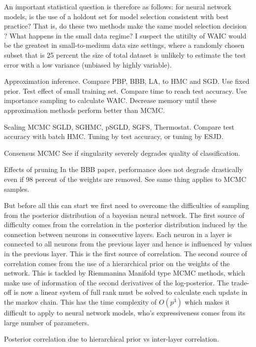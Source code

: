 \documentclass[12pt]{report}
\begin{document}
\begin{enumerate}
An important statistical question is therefore as follows: for neural network models, is
the use of a holdout set for model selection consistent with best practice?
That is, do these two methods make the same model selection decision ? What happens
in the small data regime? I suspect the utitilty of WAIC would be the greatest
in small-to-medium data size settings, where a randomly chosen subset that is 25
percent the size of total dataset is unlikely to estimate the test error with a
low variance (unbiased by highly variable).

Approximation inference. 
Compare PBP, BBB, LA, to HMC and SGD. Use fixed prior. Test effect of small training
set. Compare time to reach test accuracy. Use importance sampling to calculate
WAIC. Decrease memory until these approximation methods perform better than
MCMC.

Scaling MCMC
SGLD, SGHMC, pSGLD, SGFS, Thermostat. Compare test accuracy with batch HMC.
Tuning by test accuracy, or tuning by ESJD.

Consensus MCMC 
See if singularity severely degrades quality of classification.

Effects of pruning
In the BBB paper, performance does not degrade drastically even if 98 percent of
the weights are removed. See same thing applies to MCMC samples. 





But before all this can start we first need to overcome the difficulties of
sampling from the posterior distribution of a bayesian neural network. The
first source of difficulty comes from the correlation in the posterior distribution induced by
the connection between neurons in consecutive layers. Each neuron in a layer is
connected to all neurons from the previous layer and hence is influenced by
values in the previous layer. This is the first source of correlation. The
second source of correlation comes from the use of a hierarchical prior on the
weights of the network. This is tackled by Riemmanina Manifold type MCMC
methods, which make use of information of the second derivatives of the
log-posterior. The trade-off is now a linear system of full rank must be solved
to calculate each update in the markov chain. This has the time complexity of
$O(p^3)$ which makes it difficult to apply to neural network models, who's
expressiveness comes from its large number of parameters. 

Posterior correlation due to hierarchical prior vs inter-layer correlation. 


\end{enumerate}
\end{document}

